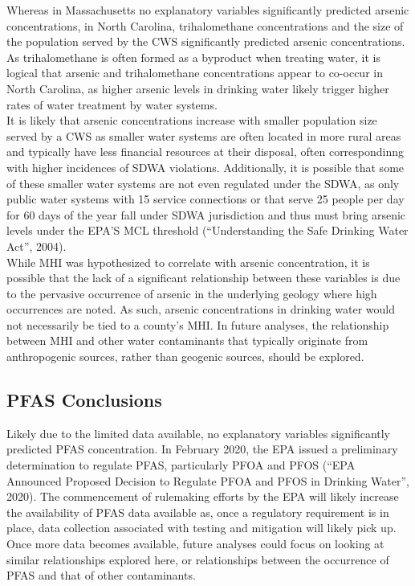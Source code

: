 \documentclass[12pt,]{article}
\begin{document}
Whereas in Massachusetts no explanatory variables significantly
predicted arsenic concentrations, in North Carolina, trihalomethane
concentrations and the size of the population served by the CWS
significantly predicted arsenic concentrations. As trihalomethane is
often formed as a byproduct when treating water, it is logical that
arsenic and trihalomethane concentrations appear to co-occur in North
Carolina, as higher arsenic levels in drinking water likely trigger
higher rates of water treatment by water systems.\\
It is likely that arsenic concentrations increase with smaller
population size served by a CWS as smaller water systems are often
located in more rural areas and typically have less financial resources
at their disposal, often correspondinng with higher incidences of SDWA
violations. Additionally, it is possible that some of these smaller
water systems are not even regulated under the SDWA, as only public
water systems with 15 service connections or that serve 25 people per
day for 60 days of the year fall under SDWA jurisdiction and thus must
bring arsenic levels under the EPA'S MCL threshold (``Understanding the
Safe Drinking Water Act'', 2004).\\
While MHI was hypothesized to correlate with arsenic concentration, it
is possible that the lack of a significant relationship between these
variables is due to the pervasive occurrence of arsenic in the
underlying geology where high occurrences are noted. As such, arsenic
concentrations in drinking water would not necessarily be tied to a
county's MHI. In future analyses, the relationship between MHI and other
water contaminants that typically originate from anthropogenic sources,
rather than geogenic sources, should be explored.

\hypertarget{pfas-conclusions}{%
\subsection{PFAS Conclusions}\label{pfas-conclusions}}

Likely due to the limited data available, no explanatory variables
significantly predicted PFAS concentration. In February 2020, the EPA
issued a preliminary determination to regulate PFAS, particularly PFOA
and PFOS (``EPA Announced Proposed Decision to Regulate PFOA and PFOS in
Drinking Water'', 2020). The commencement of rulemaking efforts by the
EPA will likely increase the availability of PFAS data available as,
once a regulatory requirement is in place, data collection associated
with testing and mitigation will likely pick up. Once more data becomes
available, future analyses could focus on looking at similar
relationships explored here, or relationships between the occurrence of
PFAS and that of other contaminants.
\end{document}
